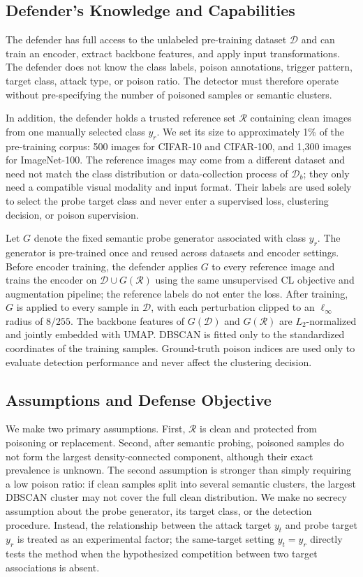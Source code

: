 \documentclass[10pt,journal]{IEEEtran}
\begin{document}
\subsection{Defender's Knowledge and Capabilities}
The defender has full access to the unlabeled pre-training dataset $\mathcal{D}$ and can train an encoder, extract backbone features, and apply input transformations. The defender does not know the class labels, poison annotations, trigger pattern, target class, attack type, or poison ratio. The detector must therefore operate without pre-specifying the number of poisoned samples or semantic clusters.

In addition, the defender holds a trusted reference set $\mathcal{R}$ containing clean images from one manually selected class $y_r$. We set its size to approximately 1\% of the pre-training corpus: 500 images for CIFAR-10 and CIFAR-100, and 1,300 images for ImageNet-100. The reference images may come from a different dataset and need not match the class distribution or data-collection process of $\mathcal{D}_{b}$; they only need a compatible visual modality and input format. Their labels are used solely to select the probe target class and never enter a supervised loss, clustering decision, or poison supervision.

Let $G$ denote the fixed semantic probe generator associated with class $y_r$. The generator is pre-trained once and reused across datasets and encoder settings. Before encoder training, the defender applies $G$ to every reference image and trains the encoder on $\mathcal{D}\cup G(\mathcal{R})$ using the same unsupervised CL objective and augmentation pipeline; the reference labels do not enter the loss. After training, $G$ is applied to every sample in $\mathcal{D}$, with each perturbation clipped to an $\ell_{\infty}$ radius of $8/255$. The backbone features of $G(\mathcal{D})$ and $G(\mathcal{R})$ are $L_2$-normalized and jointly embedded with UMAP. DBSCAN is fitted only to the standardized coordinates of the training samples. Ground-truth poison indices are used only to evaluate detection performance and never affect the clustering decision.

\subsection{Assumptions and Defense Objective}
We make two primary assumptions. First, $\mathcal{R}$ is clean and protected from poisoning or replacement. Second, after semantic probing, poisoned samples do not form the largest density-connected component, although their exact prevalence is unknown. The second assumption is stronger than simply requiring a low poison ratio: if clean samples split into several semantic clusters, the largest DBSCAN cluster may not cover the full clean distribution. We make no secrecy assumption about the probe generator, its target class, or the detection procedure. Instead, the relationship between the attack target $y_t$ and probe target $y_r$ is treated as an experimental factor; the same-target setting $y_t=y_r$ directly tests the method when the hypothesized competition between two target associations is absent.
\end{document}
